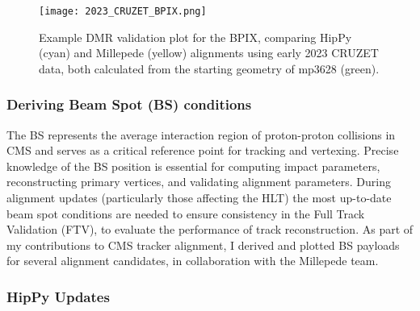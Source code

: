\begin{figure}[!hbt]
    \begin{center}
        \texttt{[image: 2023\_CRUZET\_BPIX.png]}
        \caption{Example DMR validation plot for the BPIX, comparing HipPy (cyan) and Millepede (yellow) alignments using early 2023 CRUZET data, both calculated from the starting geometry of mp3628 (green).}
        \label{fig:2023_CRUZET_BPIX}
    \end{center}
\end{figure}






\subsubsection{Deriving Beam Spot (BS) conditions}

The BS represents the average interaction region of proton-proton collisions in CMS and serves as a critical reference point for tracking and vertexing. Precise knowledge of the BS position is essential for computing impact parameters, reconstructing primary vertices, and validating alignment parameters. During alignment updates (particularly those affecting the HLT) the most up-to-date beam spot conditions are needed to ensure consistency in the Full Track Validation (FTV), to evaluate the performance of track reconstruction. As part of my contributions to CMS tracker alignment, I derived and plotted BS payloads for several alignment candidates, in collaboration with the Millepede team.

\subsubsection{HipPy Updates}\label{sec:hippyupdates}

